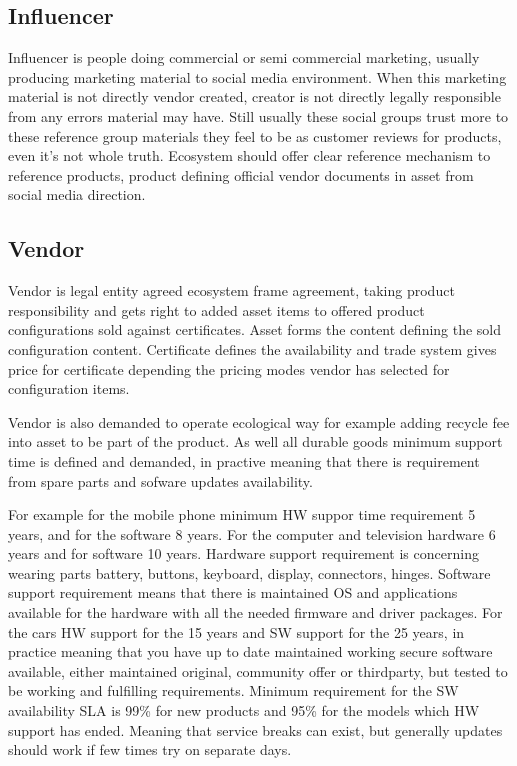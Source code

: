 \subsection{Influencer}\label{influencer}
Influencer is people doing commercial or semi commercial marketing, usually
producing marketing material to social media environment. When this marketing
material is not directly vendor created, creator is not directly legally
responsible from any errors material may have. Still usually these social
groups trust more to these reference group materials they feel to be as
customer reviews for products, even it's not whole truth. Ecosystem should
offer clear reference mechanism to reference products, product defining
official vendor documents in asset from social media direction.

\subsection{Vendor}\label{vendor}
Vendor is legal entity agreed ecosystem frame agreement, taking product
responsibility and gets right to added asset items to offered product
configurations sold against certificates. Asset forms the content defining
the sold configuration content. Certificate defines the availability and
trade system gives price for certificate depending the pricing modes vendor
has selected for configuration items.

Vendor is also demanded to operate ecological way for example adding recycle
fee into asset to be part of the product. As well all durable goods minimum
support time is defined and demanded, in practive meaning that there is
requirement from spare parts and sofware updates availability.

For example for the mobile phone minimum HW suppor time requirement 5 years,
and for the software 8 years. For the computer and television hardware 6 years
and for software 10 years. Hardware support requirement is concerning wearing
parts battery, buttons, keyboard, display, connectors, hinges. Software
support requirement means that there is maintained OS and applications
available for the hardware with all the needed firmware and driver packages.
For the cars HW support for the 15 years and SW support for the 25 years, in
practice meaning that you have up to date maintained working secure software
available, either maintained original, community offer or thirdparty, but
tested to be working and fulfilling requirements. Minimum requirement for the
SW availability SLA is 99\% for new products and 95\% for the models which HW
support has ended. Meaning that service breaks can exist, but generally
updates should work if few times try on separate days.

